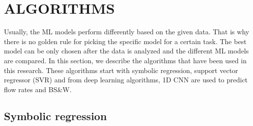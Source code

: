 \begin{table}[]
\caption{Feature Rotation for BS\&W}
\label{tab:wc_rotation}
\end{table}



\section{ALGORITHMS}
Usually, the ML models perform differently based on the given data. That is why there is no golden rule for picking the specific model for a certain task. The best model can be only chosen after the data is analyzed and the different ML models are compared. In this section, we describe the algorithms that have been used in this research. These algorithms start with symbolic regression, support vector regressor (SVR) and from deep learning algorithms, 1D \ac{CNN} are used to predict flow rates and BS\&W. 

\subsection{Symbolic regression}

